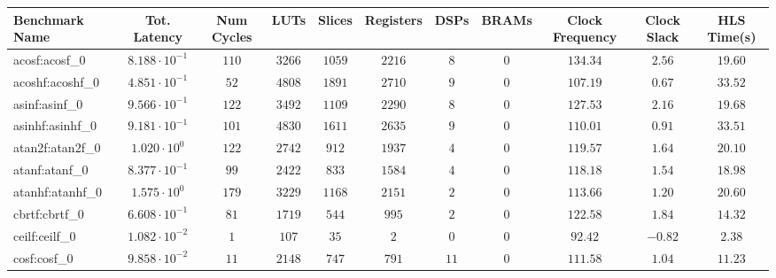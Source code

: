 \begin{tabular}{|l|c|c|c|c|c|c|c|c|c|c|}
\hline
Benchmark Name               & Tot. Latency            & Num Cycles & LUTs      & Slices    & Registers & DSPs    & BRAMs & Clock Frequency & Clock Slack & HLS Time(s) \\
\hline
acosf:acosf\_0               & $ 8.188 \cdot 10^{-1} $ & $ 110    $ & $ 3266  $ & $ 1059  $ & $ 2216  $ & $ 8   $ & $ 0 $ & $ 134.34      $ & $ 2.56    $ & $ 19.60   $ \\
acoshf:acoshf\_0             & $ 4.851 \cdot 10^{-1} $ & $ 52     $ & $ 4808  $ & $ 1891  $ & $ 2710  $ & $ 9   $ & $ 0 $ & $ 107.19      $ & $ 0.67    $ & $ 33.52   $ \\
asinf:asinf\_0               & $ 9.566 \cdot 10^{-1} $ & $ 122    $ & $ 3492  $ & $ 1109  $ & $ 2290  $ & $ 8   $ & $ 0 $ & $ 127.53      $ & $ 2.16    $ & $ 19.68   $ \\
asinhf:asinhf\_0             & $ 9.181 \cdot 10^{-1} $ & $ 101    $ & $ 4830  $ & $ 1611  $ & $ 2635  $ & $ 9   $ & $ 0 $ & $ 110.01      $ & $ 0.91    $ & $ 33.51   $ \\
atan2f:atan2f\_0             & $ 1.020 \cdot 10^{0}  $ & $ 122    $ & $ 2742  $ & $ 912   $ & $ 1937  $ & $ 4   $ & $ 0 $ & $ 119.57      $ & $ 1.64    $ & $ 20.10   $ \\
atanf:atanf\_0               & $ 8.377 \cdot 10^{-1} $ & $ 99     $ & $ 2422  $ & $ 833   $ & $ 1584  $ & $ 4   $ & $ 0 $ & $ 118.18      $ & $ 1.54    $ & $ 18.98   $ \\
atanhf:atanhf\_0             & $ 1.575 \cdot 10^{0}  $ & $ 179    $ & $ 3229  $ & $ 1168  $ & $ 2151  $ & $ 2   $ & $ 0 $ & $ 113.66      $ & $ 1.20    $ & $ 20.60   $ \\
cbrtf:cbrtf\_0               & $ 6.608 \cdot 10^{-1} $ & $ 81     $ & $ 1719  $ & $ 544   $ & $ 995   $ & $ 2   $ & $ 0 $ & $ 122.58      $ & $ 1.84    $ & $ 14.32   $ \\
ceilf:ceilf\_0               & $ 1.082 \cdot 10^{-2} $ & $ 1      $ & $ 107   $ & $ 35    $ & $ 2     $ & $ 0   $ & $ 0 $ & $ 92.42       $ & $ -0.82   $ & $ 2.38    $ \\
cosf:cosf\_0                 & $ 9.858 \cdot 10^{-2} $ & $ 11     $ & $ 2148  $ & $ 747   $ & $ 791   $ & $ 11  $ & $ 0 $ & $ 111.58      $ & $ 1.04    $ & $ 11.23   $ \\

\end{tabular}
